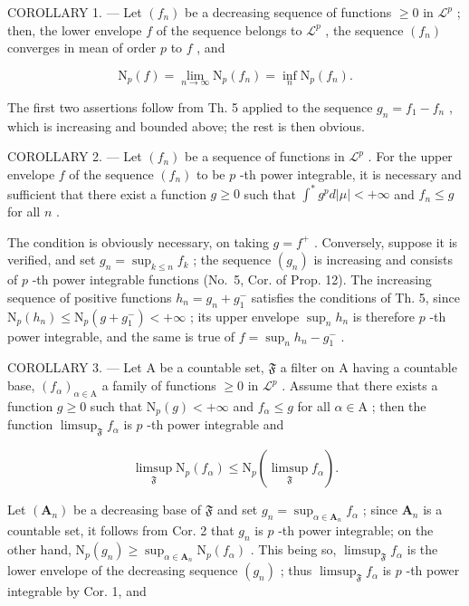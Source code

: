 COROLLARY 1. --- Let \((f_n)\) be a decreasing sequence of functions \(\geqslant 0\) in \(\mathcal{L}^p\) ; then, the lower envelope \(f\) of the sequence belongs to \(\mathcal{L}^p\) , the sequence \((f_n)\) converges in mean of order \(p\) to \(f\) , and

\[
\mathrm{N} _ {p} (f) = \lim _ {n \rightarrow \infty} \mathrm{N} _ {p} (f _ {n}) = \inf _ {n} \mathrm{N} _ {p} (f _ {n}).
\]

The first two assertions follow from Th. 5 applied to the sequence \(g_{n} = f_{1} - f_{n}\) , which is increasing and bounded above; the rest is then obvious.

COROLLARY 2. --- Let \((f_n)\) be a sequence of functions in \(\mathcal{L}^p\) . For the upper envelope \(f\) of the sequence \((f_n)\) to be \(p\) -th power integrable, it is necessary and sufficient that there exist a function \(g \geqslant 0\) such that \(\int^{*} g^p d|\mu| < +\infty\) and \(f_n \leqslant g\) for all \(n\) .

The condition is obviously necessary, on taking \(g = f^{+}\) . Conversely, suppose it is verified, and set \(g_{n} = \sup_{k\leqslant n}f_{k}\) ; the sequence \((g_{n})\) is increasing and consists of \(p\) -th power integrable functions (No.~5, Cor. of Prop. 12). The increasing sequence of positive functions \(h_n = g_n + g_1^-\) satisfies the conditions of Th. 5, since \(\mathrm{N}_p(h_n)\leqslant \mathrm{N}_p(g + g_1^-) < +\infty\) ; its upper envelope \(\sup_{n}h_{n}\) is therefore \(p\) -th power integrable, and the same is true of \(f = \sup_{n}h_{n} - g_{1}^{-}\) .

COROLLARY 3. --- Let A be a countable set, \(\mathfrak{F}\) a filter on A having a countable base, \((f_{\alpha})_{\alpha \in \mathrm{A}}\) a family of functions \(\geqslant 0\) in \(\mathcal{L}^p\) . Assume that there exists a function \(g \geqslant 0\) such that \(\mathrm{N}_p(g) < +\infty\) and \(f_{\alpha} \leqslant g\) for all \(\alpha \in \mathrm{A}\) ; then the function \(\limsup_{\mathfrak{F}} f_{\alpha}\) is \(p\) -th power integrable and

\[
\limsup _ {\mathfrak {F}} \mathrm{N} _ {p} (f _ {\alpha}) \leqslant \mathrm{N} _ {p} (\limsup _ {\mathfrak {F}} f _ {\alpha}).\tag{12}
\]

Let \((\mathbf{A}_n)\) be a decreasing base of \(\mathfrak{F}\) and set \(g_{n} = \sup_{\alpha \in \mathbf{A}_{n}}f_{\alpha}\) ; since \(\mathbf{A}_n\) is a countable set, it follows from Cor. 2 that \(g_{n}\) is \(p\) -th power integrable; on the other hand, \(\mathrm{N}_p(g_n)\geqslant \sup_{\alpha \in \mathbf{A}_n}\mathrm{N}_p(f_\alpha)\) . This being so, \(\limsup_{\mathfrak{F}}f_{\alpha}\) is the lower envelope of the decreasing sequence \((g_n)\) ; thus \(\limsup_{\mathfrak{F}}f_{\alpha}\) is \(p\) -th power integrable by Cor. 1, and

